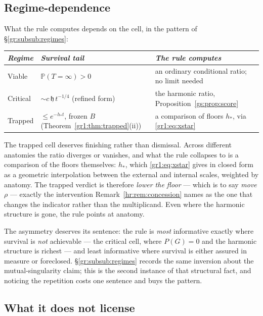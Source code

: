 \documentclass[11pt]{article}
\numberwithin{equation}{section}
\theoremstyle{plain}
\theoremstyle{definition}
\theoremstyle{remark}
\newcommand{\PP}{\mathbb{P}}
\newcommand{\hm}{\mathfrak{h}}
\begin{document}
\subsection{Regime-dependence}\label{gs:sub:regimes}

What the rule computes depends on the cell, in the pattern of \S\ref{gr:subsub:regimes}:

\begin{center}\small
\begin{tabular}{@{}lll@{}}
\toprule
\emph{Regime} & \emph{Survival tail} & \emph{The rule computes} \\
\midrule
Viable & $\PP(T = \infty) > 0$ & an ordinary conditional ratio; no limit needed \\
Critical & $\sim c\,\hm\,t^{-1/4}$ (refined form) & the harmonic ratio, Proposition~\ref{gs:prop:score} \\
Trapped & $\le e^{-h_\ast t}$, frozen $B$ (Theorem~\ref{gr1:thm:trapped}(ii)) & a comparison of floors $h_\ast$, via \eqref{gr1:eq:xstar} \\
\bottomrule
\end{tabular}
\end{center}

The trapped cell deserves finishing rather than dismissal. Across different anatomies the ratio diverges or vanishes, and what the rule collapses to is a comparison of the floors themselves: $h_\ast$, which \eqref{gr1:eq:xstar} gives in closed form as a geometric interpolation between the external and internal scales, weighted by anatomy. The trapped verdict is therefore \emph{lower the floor} --- which is to say \emph{move $\rho$} --- exactly the intervention Remark~\ref{hr:rem:concession} names as the one that changes the indicator rather than the multiplicand. Even where the harmonic structure is gone, the rule points at anatomy.

The asymmetry deserves its sentence: the rule is \emph{most} informative exactly where survival is \emph{not} achievable --- the critical cell, where $P(G) = 0$ and the harmonic structure is richest --- and least informative where survival is either assured in measure or foreclosed. \S\ref{gr:subsub:regimes} records the same inversion about the mutual-singularity claim; this is the second instance of that structural fact, and noticing the repetition costs one sentence and buys the pattern.

\subsection{What it does not license}\label{gs:sub:fence}
\end{document}
